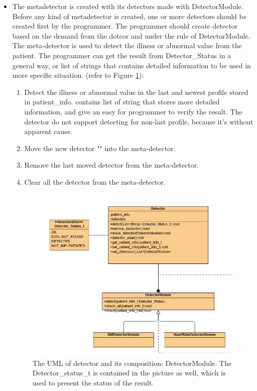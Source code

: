\documentclass{article}
\begin{document}
\begin{itemize}
    \item  The meta\-detector is created with its detectors made with DetectorModule. Before any kind of meta\-detector is created, one or more detectors should be created first by the programmer. The programmer should create detector based on the demand from the dotcor and under the rule of DetectorModule. The meta-detector is used to detect the illness or abnormal value from the patient. The programmer can get the result from Detector\_Status in a general way, or list of strings that contains detailed information to be used in more specific situation.    (refer to Figure \ref{fig:pre_detector}):
    \begin{enumerate}[label=(\roman*)]
        \item {} Detect the illness or abnormal value in the last and newest profile stored in patient\_info.  contains list of string that stores more detailed information, and  give an easy for programmer to verify the result. The detector do not support detecting for non-last profile, because it's without apparent cause.
        \item {} Move the new detector "" into the meta-detector.
        \item {} Remove the last moved detector from the meta-detector.
        \item {} Clear all the detector from the meta-detector.
    \end{enumerate}
    \begin{figure}[H]
      \centering
      \includegraphics[scale = 0.35]{asset/preprocessor_and_detector/PRE_detector.png}
      \caption{The UML of detector and its composition: DetectorModule. \newline The Detector\_status\_t is contained in the picture as well, which is used to present the status of the result.}
      \label{fig:pre_detector}
    \end{figure}
\end{itemize}
\end{document}

